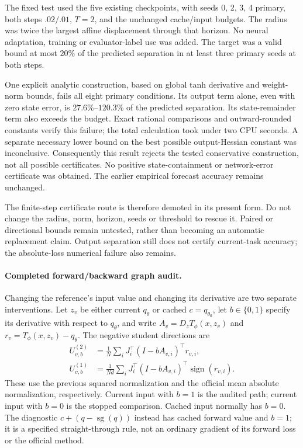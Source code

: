 \documentclass[11pt,a4paper]{article}
\begin{document}
The fixed test used the five existing checkpoints, with seeds 0, 2, 3, 4
primary, both steps $.02/.01$, $T=2$, and the unchanged cache/input budgets.
The radius was twice the largest affine displacement through that horizon.
No neural adaptation, training or evaluator-label use was added.
The target was a valid bound at most $20\%$ of the predicted separation
in at least three primary seeds at both steps.

One explicit analytic construction, based on global tanh derivative and
weight-norm bounds, fails all eight primary conditions. Its output term
alone, even with zero state error, is $27.6\%$--$120.3\%$ of the predicted
separation. Its state-remainder term also exceeds the budget. Exact rational
comparisons and outward-rounded constants verify this failure; the total
calculation took under two CPU seconds. A separate necessary lower bound
on the best possible output-Hessian constant was inconclusive. Consequently
this result rejects the tested conservative construction, not all possible
certificates. No positive state-containment or network-error certificate
was obtained. The earlier empirical forecast accuracy remains unchanged.

The finite-step certificate route is therefore demoted in its present form.
Do not change the radius, norm, horizon, seeds or threshold to rescue it.
Paired or directional bounds remain untested, rather than becoming an
automatic replacement claim. Output separation still does not certify
current-task accuracy; the absolute-loss numerical failure also remains.

\paragraph{Completed forward/backward graph audit.}
Changing the reference's input value and changing its derivative are two
separate interventions. Let $z_v$ be either current $q_\theta$ or cached
$c=q_{\theta_0}$, let $b\in\{0,1\}$ specify its derivative with respect
to $q_\theta$, and write $A_v=D_zT_\phi(x,z_v)$ and
$r_v=T_\phi(x,z_v)-q_\theta$. The negative student directions are
\begin{align*}
 U^{(2)}_{v,b}&=\frac1N\sum_i J_i^\top(I-bA_{v,i})^\top r_{v,i},\\
 U^{(1)}_{v,b}&=\frac1{Nd}\sum_i
 J_i^\top(I-bA_{v,i})^\top\operatorname{sign}(r_{v,i}).
\end{align*}
These use the previous squared normalization and the official mean absolute
normalization, respectively. Current input with $b=1$ is the audited path;
current input with $b=0$ is the stopped comparison. Cached input normally
has $b=0$. The diagnostic $c+(q-\operatorname{sg}(q))$ instead has cached
forward value and $b=1$; it is a specified straight-through rule, not an
ordinary gradient of its forward loss or the official method.
\end{document}
